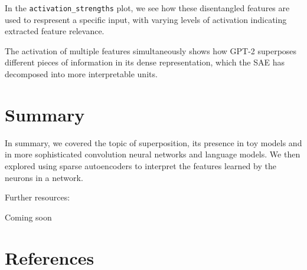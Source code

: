 \documentclass[
  letterpaper,
  DIV=11,
  numbers=noendperiod]{scrreprt}
\newlength{\cslhangindent}
\newenvironment{CSLReferences}[2] %
 {\begin{list}{}{%
  \setlength{\itemindent}{0pt}
  \setlength{\leftmargin}{0pt}
  \setlength{\parsep}{0pt}
  \ifodd #1
   \setlength{\leftmargin}{\cslhangindent}
   \setlength{\itemindent}{-1\cslhangindent}
  \fi
  \setlength{\itemsep}{#2\baselineskip}}}
 {\end{list}}
\begin{document}
In the \texttt{activation\_strengths} plot, we see how these
disentangled features are used to respresent a specific input, with
varying levels of activation indicating extracted feature relevance.

The activation of multiple features simultaneously shows how GPT-2
superposes different pieces of information in its dense representation,
which the SAE has decomposed into more interpretable units.\textbar{}


\chapter{Summary}\label{summary-1}

In summary, we covered the topic of superposition, its presence in toy
models and in more sophisticated convolution neural networks and
language models. We then explored using sparse autoencoders to interpret
the features learned by the neurons in a network.

Further resources:

Coming soon


\chapter*{References}\label{references}


\label{refs}
\begin{CSLReferences}{0}{1}
\end{CSLReferences}
\end{document}
